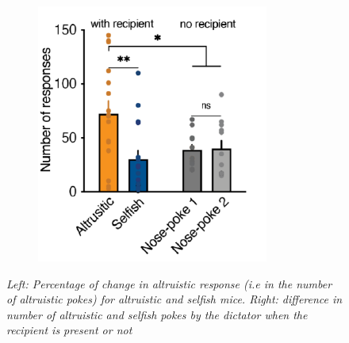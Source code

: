 \documentclass[12pt, a4paper]{article}
\begin{document}
\begin{figure}[H]
\begin{minipage}{\linewidth}
\begin{minipage}{0.46\linewidth}
\begin{figure}[H]
			\end{figure}
		\end{minipage}
		\hspace{0.05\linewidth}
		\begin{minipage}{0.46\linewidth}
			\begin{figure}[H]
				\includegraphics[width=\linewidth]{norecip.png}
				
			\end{figure}
		\end{minipage}
		
	\end{minipage}
	\caption{\textit{Left: Percentage of change in altruistic response (i.e in the number of altruistic pokes) for altruistic and selfish mice. Right: difference in number of altruistic and selfish pokes by the dictator when the recipient is present or not}} \label{altr_first}
\end{figure}
\end{document}
